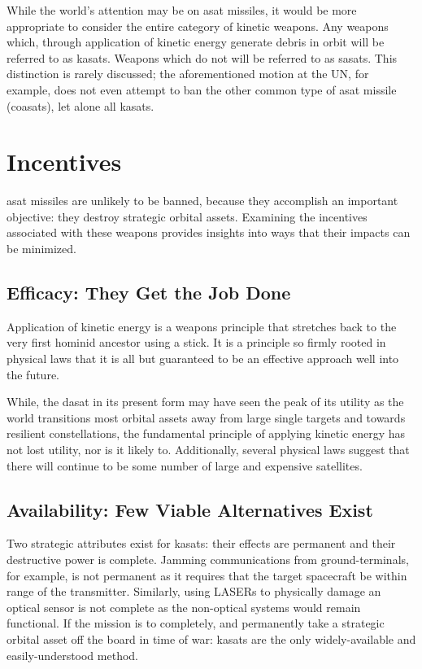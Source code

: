 While the world's attention may be on \ac{asat} missiles, it would be
more appropriate to consider the entire category of kinetic weapons.
Any weapons which, through application of kinetic energy generate
debris in orbit will be referred to as \acp{kasat}.  Weapons which do
not will be referred to as \acp{sasat}.  This distinction is rarely
discussed; the aforementioned motion at the UN, for example, does not
even attempt to ban the other common type of \ac{asat} missile
(\acp{coasat}), let alone all \acp{kasat}.\cite{un-asat-me-not}

\section*{Incentives}

\ac{asat} missiles are unlikely to be banned, because they accomplish
an important objective: they destroy strategic orbital assets.
Examining the incentives associated with these weapons provides
insights into ways that their impacts can be minimized.

\subsection*{Efficacy: They Get the Job Done}

Application of kinetic energy is a weapons principle that stretches
back to the very first hominid ancestor using a stick.  It is a
principle so firmly rooted in physical laws that it is all but
guaranteed to be an effective approach well into the future.

While, the \ac{dasat} in its present form may have seen the peak of
its utility as the world transitions most orbital assets away from
large single targets and towards resilient constellations, the
fundamental principle of applying kinetic energy has not lost utility,
nor is it likely to.  Additionally, several physical laws suggest that
there will continue to be some number of large and expensive
satellites.


\subsection*{Availability: Few Viable Alternatives Exist}

Two strategic attributes exist for \acp{kasat}: their effects are
permanent and their destructive power is complete.  Jamming
communications from ground-terminals, for example, is not permanent as
it requires that the target spacecraft be within range of the
transmitter.  Similarly, using LASERs to physically damage an optical
sensor is not complete as the non-optical systems would remain
functional.  If the mission is to completely, and permanently take a
strategic orbital asset off the board in time of war: \acp{kasat} are
the only widely-available and easily-understood method.\cite{brian}



